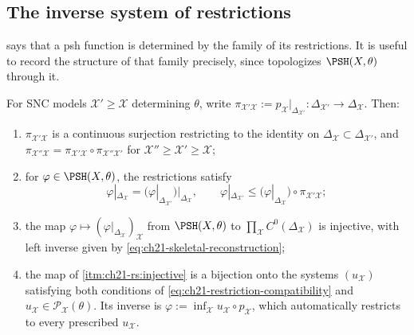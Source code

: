 \subsection{The inverse system of restrictions}
\label{sec:ch21-inverse-system}

 says that a psh function is
determined by the family of its restrictions.  It is useful to record the
structure of that family precisely, since 
topologizes $\PSH(X,\theta)$ through it.

\begin{proposition}
\label{prop:ch21-restriction-system}
For SNC models $\mathcal X'\geq\mathcal X$ determining $\theta$, write
$\pi_{\mathcal X'\mathcal X}:=p_{\mathcal X}|_{\Delta_{\mathcal X'}}:
\Delta_{\mathcal X'}\to\Delta_{\mathcal X}$.  Then:
\begin{enumerate}
\item\label{itm:ch21-rs:transition}
$\pi_{\mathcal X'\mathcal X}$ is a continuous surjection restricting to
the identity on $\Delta_{\mathcal X}\subset\Delta_{\mathcal X'}$, and
$\pi_{\mathcal X''\mathcal X}=\pi_{\mathcal X'\mathcal X}\circ
\pi_{\mathcal X''\mathcal X'}$ for
$\mathcal X''\geq\mathcal X'\geq\mathcal X$;
\item\label{itm:ch21-rs:compat}
for $\varphi\in\PSH(X,\theta)$, the restrictions satisfy
\begin{equation}
\label{eq:ch21-restriction-compatibility}
 \varphi|_{\Delta_{\mathcal X}}
 =\bigl(\varphi|_{\Delta_{\mathcal X'}}\bigr)\big|_{\Delta_{\mathcal X}},
 \qquad
 \varphi|_{\Delta_{\mathcal X'}}
 \leq\bigl(\varphi|_{\Delta_{\mathcal X}}\bigr)\circ
     \pi_{\mathcal X'\mathcal X};
\end{equation}
\item\label{itm:ch21-rs:injective}
the map
$\varphi\mapsto(\varphi|_{\Delta_{\mathcal X}})_{\mathcal X}$ from
$\PSH(X,\theta)$ to $\prod_{\mathcal X}C^0(\Delta_{\mathcal X})$ is
injective, with left inverse given by
\eqref{eq:ch21-skeletal-reconstruction};
\item\label{itm:ch21-rs:notsurjective}
the map of \cref{itm:ch21-rs:injective} is a bijection onto the systems
$(u_{\mathcal X})$ satisfying both conditions of
\eqref{eq:ch21-restriction-compatibility} and
$u_{\mathcal X}\in\mathcal P_{\mathcal X}(\theta)$.  Its inverse is
$\varphi:=\inf_{\mathcal X}u_{\mathcal X}\circ p_{\mathcal X}$, which
automatically restricts to every prescribed $u_{\mathcal X}$.
\end{enumerate}
\end{proposition}

